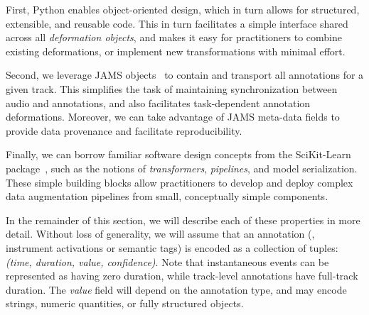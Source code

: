 \documentclass{article}
\begin{document}
%   
First, Python enables object-oriented design, which in turn allows for structured,
extensible, and reusable code.  This in turn facilitates a simple interface shared across
all \emph{deformation objects}, and makes it easy for practitioners to combine existing
deformations, or implement new transformations with minimal effort.

%

Second, we leverage JAMS objects~\cite{humphreyjams} to contain and transport all
annotations for a given track.
This simplifies the task of maintaining synchronization between audio and annotations,
and also facilitates task-dependent annotation deformations.  Moreover, we can take
advantage of JAMS meta-data fields to provide data provenance and facilitate
reproducibility.

%
Finally, we can borrow familiar software design concepts from the SciKit-Learn
package~\cite{scikit-learn}, such as the notions of \emph{transformers},
\emph{pipelines}, and model serialization.  These simple building blocks allow
practitioners to develop and deploy complex data augmentation pipelines from small,
conceptually simple components.


In the remainder of this section, we will describe each of these
properties in more detail.  Without loss of generality, we will assume that an
annotation (\eg, instrument activations or semantic tags) is encoded as a collection of
tuples: \emph{(time, duration, value, confidence)}.  
Note that instantaneous events can be represented as having zero duration, while
track-level annotations have full-track duration.  The \emph{value} field will depend on
the annotation type, and may encode strings, numeric quantities, or fully structured
objects.
\end{document}
